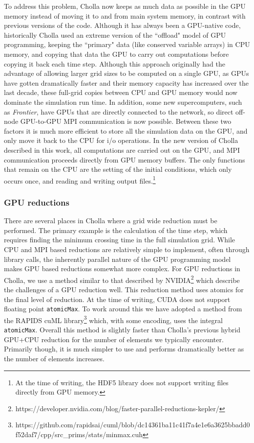 \documentclass[modern, linenumbers]{aastex631}
\begin{document}
To address this problem, Cholla now keeps as much data as possible in the GPU memory instead of moving it to and from main system memory, in contrast with previous versions of the code. Although it has always been a GPU-native code, historically Cholla used an extreme version of the ``offload" model of GPU programming, keeping the ``primary" data (like conserved variable arrays) in CPU memory, and copying that data the GPU to carry out computations before copying it back each time step. Although this approach originally had the advantage of allowing larger grid sizes to be computed on a single GPU, as GPUs have gotten dramatically faster and their memory capacity has increased over the last decade, these full-grid copies between CPU and GPU memory would now dominate the simulation run time. In addition, some new supercomputers, such as \textit{Frontier}, have GPUs that are directly connected to the network, so direct off-node GPU-to-GPU MPI communication is now possible. Between these two factors it is much more efficient to store all the simulation data on the GPU, and only move it back to the CPU for i/o operations. In the new version of Cholla described in this work, all computations are carried out on the GPU, and  MPI communication proceeds directly from GPU memory buffers. The only functions that remain on the CPU are the setting of the initial conditions, which only occurs once, and reading and writing output files.\footnote{At the time of writing, the HDF5 library does not support writing files directly from GPU memory.}

\subsubsection{GPU reductions}

There are several places in Cholla where a grid wide reduction must be performed. The primary example is the calculation of the time step, which requires finding the minimum crossing time in the full simulation grid. While CPU and MPI based reductions are relatively simple to implement, often through library calls, the inherently parallel nature of the GPU programming model makes GPU based reductions somewhat more complex. For GPU reductions in Cholla, we use a method similar to that described by NVIDIA\footnote{https://developer.nvidia.com/blog/faster-parallel-reductions-kepler/} which describe the challenges of a GPU reduction well. This reduction method uses atomics for the final level of reduction. At the time of writing, CUDA does not support floating point \texttt{atomicMax}. To work around this we have adopted a method from the RAPIDS cuML library\footnote{https://github.com/rapidsai/cuml/blob/dc14361ba11c41f7a4e1e6a3625bbadd0f52daf7/cpp/src\_prims/stats/minmax.cuh} which, with some encoding, uses the integral \texttt{atomicMax}. Overall this method is slightly faster than Cholla's previous hybrid GPU+CPU reduction for the number of elements we typically encounter. Primarily though, it is much simpler to use and performs dramatically better as the number of elements increases.
\end{document}
